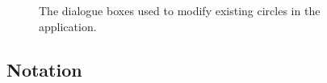 \documentclass[12pt,twoside,notitlepage,xetex]{report}
\begin{document}
\begin{center}
\begin{figure}[H]
\begin{center}
\end{center}
\caption{The dialogue boxes used to modify existing circles in the application.}
\label{fig:Dialogues}
\end{figure}
\end{center}

\subsection{Notation}%
\end{document}
